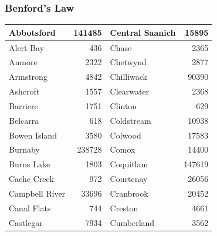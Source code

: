 \documentclass[xcolor=dvipsnames]{beamer}
\begin{document}
\begin{frame}
  \frametitle{Benford's Law}
\begin{tabular}{|l|r|l|r|}
\hline
Abbotsford     & 141485 & Central Saanich & 15895  \\
\hline
Alert Bay      & 436    & Chase           & 2365   \\
\hline
Anmore         & 2322   & Chetwynd        & 2877   \\
\hline
Armstrong      & 4842   & Chilliwack      & 90390  \\
\hline
Ashcroft       & 1557   & Clearwater      & 2368   \\
\hline
Barriere       & 1751   & Clinton         & 629    \\
\hline
Belcarra       & 618    & Coldstream      & 10938  \\
\hline
Bowen Island   & 3580   & Colwood         & 17583  \\
\hline
Burnaby        & 238728 & Comox           & 14400  \\
\hline
Burns Lake     & 1803   & Coquitlam       & 147619 \\
\hline
Cache Creek    & 972    & Courtenay       & 26056  \\
\hline
Campbell River & 33696  & Cranbrook       & 20452  \\
\hline
Canal Flats    & 744    & Creston         & 4661   \\
\hline
Castlegar      & 7934   & Cumberland      & 3562   \\
\hline
\end{tabular}

\end{frame}
\end{document}
